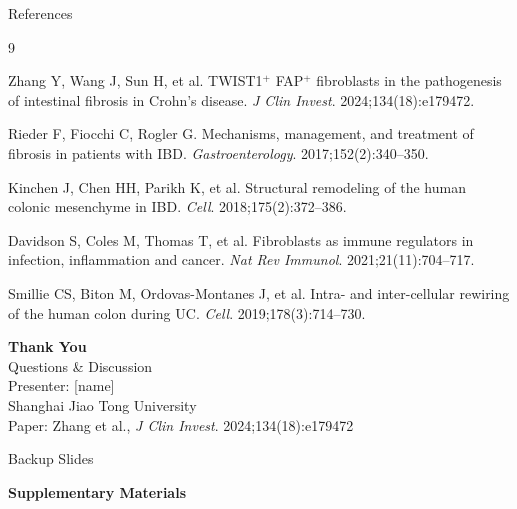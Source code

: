\documentclass[aspectratio=169,10pt]{beamer}
\begin{document}
\begin{frame}{References}
\begin{thebibliography}{9}
\small

Zhang Y, Wang J, Sun H, et al.
TWIST1$^+$ FAP$^+$ fibroblasts in the pathogenesis of intestinal fibrosis in Crohn's disease.
\textit{J Clin Invest}. 2024;134(18):e179472.

Rieder F, Fiocchi C, Rogler G.
Mechanisms, management, and treatment of fibrosis in patients with IBD.
\textit{Gastroenterology}. 2017;152(2):340--350.

Kinchen J, Chen HH, Parikh K, et al.
Structural remodeling of the human colonic mesenchyme in IBD.
\textit{Cell}. 2018;175(2):372--386.

Davidson S, Coles M, Thomas T, et al.
Fibroblasts as immune regulators in infection, inflammation and cancer.
\textit{Nat Rev Immunol}. 2021;21(11):704--717.

Smillie CS, Biton M, Ordovas-Montanes J, et al.
Intra- and inter-cellular rewiring of the human colon during UC.
\textit{Cell}. 2019;178(3):714--730.

\end{thebibliography}
\end{frame}

\begin{frame}[plain]
\vfill
\begin{center}
{\Large\bfseries Thank You}\\[12pt]
{\large Questions \& Discussion}\\[20pt]
{\small Presenter: [name]\\Shanghai Jiao Tong University\\[6pt]
Paper: Zhang et al., \textit{J Clin Invest}. 2024;134(18):e179472}
\end{center}
\vfill
\end{frame}

\appendix

\begin{frame}{Backup Slides}
\begin{center}
{\Large\bfseries Supplementary Materials}
\end{center}
\end{frame}
\end{document}
